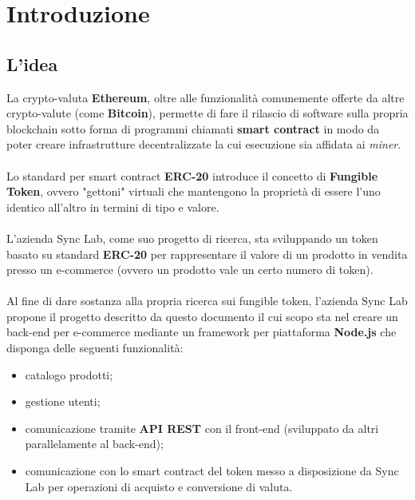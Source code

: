 
\chapter{Introduzione}
\label{cap:introduzione}

\section{L'idea}
La crypto-valuta \textbf{Ethereum}, oltre alle funzionalità comunemente offerte da altre crypto-valute (come \textbf{Bitcoin}), permette di fare il rilascio di software sulla propria blockchain sotto forma di programmi chiamati \textbf{smart contract} in modo da poter creare infrastrutture decentralizzate la cui esecuzione sia affidata ai \textit{miner}.
\\\\
Lo standard per smart contract \textbf{ERC-20} introduce il concetto di \textbf{Fungible Token}, ovvero "gettoni" virtuali che mantengono la proprietà di essere l'uno identico all'altro in termini di tipo e valore.
\\\\
L'azienda Sync Lab, come suo progetto di ricerca, sta sviluppando un token basato su standard \textbf{ERC-20} per rappresentare il valore di un prodotto in vendita presso un e-commerce (ovvero un prodotto vale un certo numero di token).
\\\\
Al fine di dare sostanza alla propria ricerca sui fungible token, l'azienda Sync Lab propone il progetto descritto da questo documento il cui scopo sta nel creare un back-end per e-commerce mediante un framework per piattaforma \textbf{Node.js} che disponga delle seguenti funzionalità:
\begin{itemize}
    \item catalogo prodotti;
    \item gestione utenti;
    \item comunicazione tramite \textbf{API REST} con il front-end (sviluppato da altri parallelamente al back-end);
    \item comunicazione con lo smart contract del token messo a disposizione da Sync Lab per operazioni di acquisto e conversione di valuta.
\end{itemize}


